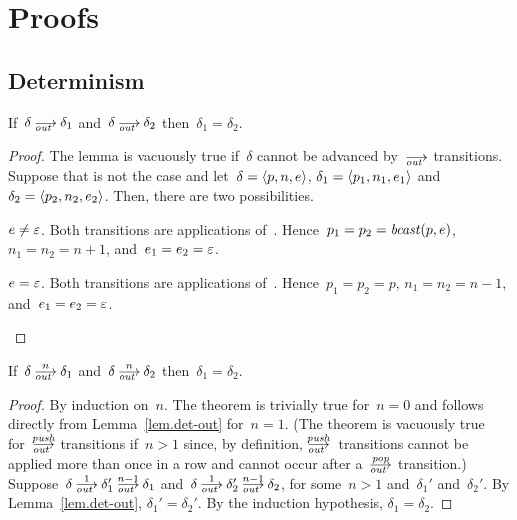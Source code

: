 \appendix
\section{Proofs}
\label{sec.proofs}

\subsection*{Determinism}


\begin{lemma}
  \label{lem.det-out}
  If~$\delta\out\delta_1$ and~$\delta\out\delta_2$ then~$\delta_1=\delta_2$.
\end{lemma}
\begin{proof}
  The lemma is vacuously true if~$\delta$ cannot be advanced by~$\out$
  transitions.  Suppose that is not the case and let~$\delta=\<p,n,e>$,
  $\delta_1=\<p_1,n_1,e_1>$ and~$\delta_2=\<p_2,n_2,e_2>$.  Then, there are
  two possibilities.
  \begin{case}
    $e\ne\varepsilon$.  Both transitions are applications of~.
    Hence~$p_1=p_2=\operatorname{\mathit{bcast}}(p,e)$, $n_1=n_2=n+1$, and~$e_1=e_2=\varepsilon$.
  \end{case}
  \begin{case}
    $e=\varepsilon$.  Both transitions are applications of~.
    Hence~$p_1=p_2=p$, $n_1=n_2=n-1$, and~$e_1=e_2=\varepsilon$.\qedhere
  \end{case}
\end{proof}


\begin{theorem}
  \label{thm.det-out-pop-n}
  If~$\delta\out[n]\delta_1$ and~$\delta\out[n]\delta_2$
  then~$\delta_1=\delta_2$.
\end{theorem}
\begin{proof}
  By induction on~$n$.
  The theorem is trivially true for~$n=0$ and follows directly from
  Lemma~\ref{lem.det-out} for~$n=1$.  (The theorem is vacuously true
  for~$\outpush$ transitions if~$n>1$ since, by definition,
  $\outpush$~transitions cannot be applied more than once in a row and
  cannot occur after a~$\outpop$ transition.)
  Suppose~$\delta\out[1]\delta_1'\out[n-1]\delta_1$
  and~$\delta\out[1]\delta_2'\out[n-1]\delta_2$, for some~$n>1$
  and~$\delta_1'$ and~$\delta_2'$.
  By Lemma~\ref{lem.det-out}, $\delta_1'=\delta_2'$.  By the induction
  hypothesis, $\delta_1=\delta_2$.\qedhere
\end{proof}

